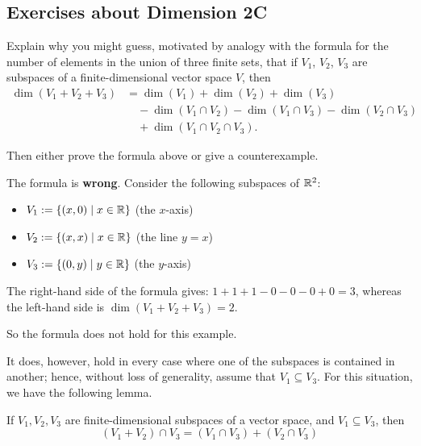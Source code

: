 \subsection*{Exercises about Dimension 2C}

\setcounter{xrcscount}{19}
\begin{xrcs}
  Explain why you might guess, motivated by analogy with the formula for the number of elements in the union of three finite sets, that if $V_1$, $V_2$, $V_3$ are subspaces of a finite-dimensional vector space $V$, then
  \begin{equation}
      \begin{aligned}
      \dim (V_1 + V_2 + V_3) &= \dim (V_1) + \dim (V_2) + \dim (V_3) \\
      & \quad - \dim(V_1 \cap V_2) - \dim (V_1 \cap V_3) - \dim (V_2 \cap V_3) \\
      & \quad + \dim (V_1 \cap V_2 \cap V_3).
    \end{aligned}
  \end{equation}


  Then either prove the formula above or give a counterexample.


  The formula is \textbf{wrong}. Consider the following subspaces of $\mathbb{R}^2$:
  \begin{itemize}
    \item $V_1 := \{ (x,0) \mid x \in \mathbb{R} \} $ \quad (the $x$-axis) \\
    \item $V_2 := \{ (x,x) \mid x \in \mathbb{R} \} $ \quad (the line $y=x$)
    \item $V_3 := \{ (0,y) \mid y \in \mathbb{R} \} $ \quad (the $y$-axis)
  \end{itemize}

  The right-hand side of the formula gives: $1+1+1-0-0-0+0 = 3$, whereas the left-hand side is $\dim (V_1 + V_2 + V_3) = 2$.

  So the formula does not hold for this example.

  It does, however, hold in every case where one of the subspaces is contained in another; hence, without loss of generality, assume that $V_1 \subseteq V_3$. For this situation, we have the following lemma.

   If $V_1, V_2, V_3$ are finite-dimensional subspaces of a vector space, and $V_1 \subseteq V_3$, then
  \begin{equation}
    \label{eq: lemma}
     (V_1 + V_2) \cap V_3 = (V_1 \cap V_3) + (V_2 \cap V_3)
  \end{equation}


\end{xrcs}
